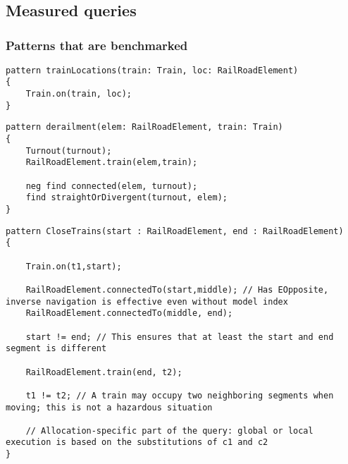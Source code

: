 \appendix
\chapter*{\fuggelek}
\setcounter{chapter}{\appendixnumber}

\section{Measured queries}


\subsection{Patterns that are benchmarked}

\begin{lstlisting}[language = vql]
pattern trainLocations(train: Train, loc: RailRoadElement)
{
	Train.on(train, loc);
}
\end{lstlisting}

\begin{lstlisting}[language = vql]
pattern derailment(elem: RailRoadElement, train: Train)
{
	Turnout(turnout);
	RailRoadElement.train(elem,train);
	
	neg find connected(elem, turnout);
	find straightOrDivergent(turnout, elem);
}
\end{lstlisting}

\begin{lstlisting}[language = vql]
pattern CloseTrains(start : RailRoadElement, end : RailRoadElement)
{
	
	Train.on(t1,start);
	
	RailRoadElement.connectedTo(start,middle); // Has EOpposite, inverse navigation is effective even without model index
	RailRoadElement.connectedTo(middle, end);
	
	start != end; // This ensures that at least the start and end segment is different
	
	RailRoadElement.train(end, t2);
	
	t1 != t2; // A train may occupy two neighboring segments when moving; this is not a hazardous situation
	
	// Allocation-specific part of the query: global or local execution is based on the substitutions of c1 and c2
}
\end{lstlisting}

